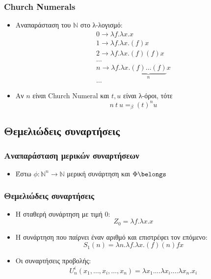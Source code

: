 \documentclass{beamer}
\begin{document}
\begin{frame}
        \frametitle{Church Numerals}
        \begin{itemize}
                \item Αναπαράσταση του \( \mathbb{N} \) στο λ-λογισμό:
                \pause
	        	\[ \begin{array}{l}
	        		0 \rightarrow \lambda f . \lambda x . x \\
	        		1 \rightarrow \lambda f . \lambda x . (f) x \\
	        		2 \rightarrow \lambda f . \lambda x . (f) (f) x \\
	        		\ldots \\
	        		n \rightarrow \lambda f . \lambda x . \underbrace{(f) \ldots (f)}_n x \\
	        		\ldots
	        	\end{array} \]
	        	\pause
                \item Αν \(n \) είναι Church Numeral και \(t, u\) είναι λ-όροι, τότε
                \[ n\:t\:u =_\beta (t)^n u \]
        \end{itemize}
\end{frame}

\subsection{Θεμελιώδεις συναρτήσεις}
\begin{frame}
        \frametitle{Αναπαράσταση μερικών συναρτήσεων}
        \begin{itemize}
                \item Έστω $\phi : \mathbb{N}^n \rightarrow \mathbb{N}$ μερική συνάρτηση και $\Phi \belongs $
                \pause
               
        \end{itemize}
\end{frame}




\begin{frame}
        \frametitle{Θεμελιώδεις συναρτήσεις}
        \begin{itemize}
                \item Η σταθερή συνάρτηση με τιμή 0: \[Z_0=\lambda f . \lambda x . x\]
                \pause
                \item Η συνάρτηση που παίρνει έναν αριθμό και επιστρέφει τον επόμενο: \[S_1(n)=\lambda n . \lambda f . \lambda x . (f) (n) f x\]
                \pause
                \item Οι συναρτήσεις προβολής: \[U^i_n(x_1,\ldots,x_i,\ldots,x_n)= \lambda x_1 . \ldots \lambda x_i . \ldots \lambda x_n . x_i\]
        \end{itemize}
\end{frame}
\end{document}
